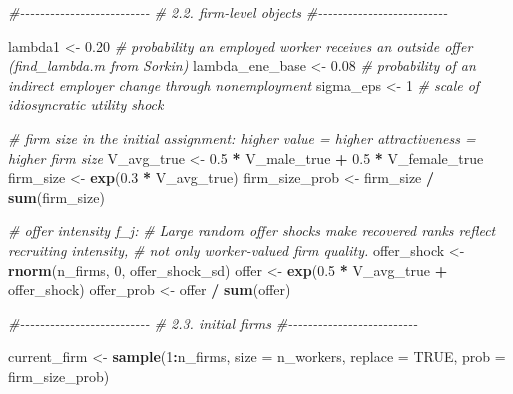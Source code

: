 \documentclass[
]{article}
\newenvironment{Shaded}{\begin{snugshade}}{\end{snugshade}}
\newcommand{\AttributeTok}[1]{\textcolor[rgb]{0.13,0.29,0.53}{#1}}
\newcommand{\CommentTok}[1]{\textcolor[rgb]{0.56,0.35,0.01}{\textit{#1}}}
\newcommand{\ConstantTok}[1]{\textcolor[rgb]{0.56,0.35,0.01}{#1}}
\newcommand{\DecValTok}[1]{\textcolor[rgb]{0.00,0.00,0.81}{#1}}
\newcommand{\FloatTok}[1]{\textcolor[rgb]{0.00,0.00,0.81}{#1}}
\newcommand{\FunctionTok}[1]{\textcolor[rgb]{0.13,0.29,0.53}{\textbf{#1}}}
\newcommand{\NormalTok}[1]{#1}
\newcommand{\OtherTok}[1]{\textcolor[rgb]{0.56,0.35,0.01}{#1}}
\newcommand{\SpecialCharTok}[1]{\textcolor[rgb]{0.81,0.36,0.00}{\textbf{#1}}}
\begin{document}
\begin{Shaded}
\begin{Highlighting}[]
        \CommentTok{\#{-}{-}{-}{-}{-}{-}{-}{-}{-}{-}{-}{-}{-}{-}{-}{-}{-}{-}{-}{-}{-}{-}{-}{-}{-}{-}}
        \CommentTok{\# 2.2. firm{-}level objects}
        \CommentTok{\#{-}{-}{-}{-}{-}{-}{-}{-}{-}{-}{-}{-}{-}{-}{-}{-}{-}{-}{-}{-}{-}{-}{-}{-}{-}{-}}

\NormalTok{        lambda1 }\OtherTok{\textless{}{-}} \FloatTok{0.20} \CommentTok{\# probability an employed worker receives an outside offer (find\_lambda.m from Sorkin)}
\NormalTok{        lambda\_ene\_base }\OtherTok{\textless{}{-}} \FloatTok{0.08} \CommentTok{\# probability of an indirect employer change through nonemployment}
\NormalTok{        sigma\_eps }\OtherTok{\textless{}{-}} \DecValTok{1} \CommentTok{\# scale of idiosyncratic utility shock}

        \CommentTok{\# firm size in the initial assignment: higher value = higher attractiveness = higher firm size}
\NormalTok{        V\_avg\_true }\OtherTok{\textless{}{-}} \FloatTok{0.5} \SpecialCharTok{*}\NormalTok{ V\_male\_true }\SpecialCharTok{+} \FloatTok{0.5} \SpecialCharTok{*}\NormalTok{ V\_female\_true}
\NormalTok{        firm\_size }\OtherTok{\textless{}{-}} \FunctionTok{exp}\NormalTok{(}\FloatTok{0.3} \SpecialCharTok{*}\NormalTok{ V\_avg\_true)}
\NormalTok{        firm\_size\_prob }\OtherTok{\textless{}{-}}\NormalTok{ firm\_size }\SpecialCharTok{/} \FunctionTok{sum}\NormalTok{(firm\_size)}

        \CommentTok{\# offer intensity f\_j:}
        \CommentTok{\# Large random offer shocks make recovered ranks reflect recruiting intensity,}
        \CommentTok{\# not only worker{-}valued firm quality.}
\NormalTok{        offer\_shock }\OtherTok{\textless{}{-}} \FunctionTok{rnorm}\NormalTok{(n\_firms, }\DecValTok{0}\NormalTok{, offer\_shock\_sd)}
\NormalTok{        offer }\OtherTok{\textless{}{-}} \FunctionTok{exp}\NormalTok{(}\FloatTok{0.5} \SpecialCharTok{*}\NormalTok{ V\_avg\_true }\SpecialCharTok{+}\NormalTok{ offer\_shock)}
\NormalTok{        offer\_prob }\OtherTok{\textless{}{-}}\NormalTok{ offer }\SpecialCharTok{/} \FunctionTok{sum}\NormalTok{(offer)}

        \CommentTok{\#{-}{-}{-}{-}{-}{-}{-}{-}{-}{-}{-}{-}{-}{-}{-}{-}{-}{-}{-}{-}{-}{-}{-}{-}{-}{-}}
        \CommentTok{\# 2.3. initial firms}
        \CommentTok{\#{-}{-}{-}{-}{-}{-}{-}{-}{-}{-}{-}{-}{-}{-}{-}{-}{-}{-}{-}{-}{-}{-}{-}{-}{-}{-}}

\NormalTok{        current\_firm }\OtherTok{\textless{}{-}} \FunctionTok{sample}\NormalTok{(}\DecValTok{1}\SpecialCharTok{:}\NormalTok{n\_firms, }\AttributeTok{size =}\NormalTok{ n\_workers, }\AttributeTok{replace =} \ConstantTok{TRUE}\NormalTok{, }\AttributeTok{prob =}\NormalTok{ firm\_size\_prob)}


\end{Highlighting}
\end{Shaded}
\end{document}
